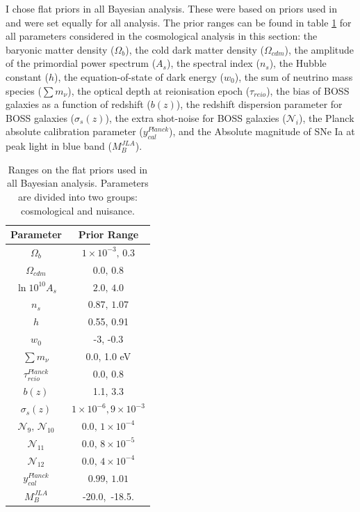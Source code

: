 \qquad I chose flat priors in all Bayesian analysis. These were based on priors used in \cite{JLAdata,2016BOSSCosmology,PlanckCosmology2016,2017arXiv170801530D} and were set equally for all analysis. The prior ranges can be found in table \ref{Tb:Priors} for all parameters considered in the cosmological analysis in this section: the baryonic matter density ($\Omega_b$), the cold dark matter density ($\Omega_{cdm}$), the amplitude of the primordial power spectrum ($A_s$), the spectral index ($n_s$), the Hubble constant ($h$), the equation-of-state of dark energy ($w_0$), the sum of neutrino mass species ($\sum m_{\nu}$), the optical depth at reionisation epoch ($\tau_{reio}$), the bias of BOSS galaxies as a function of redshift ($b(z)$), the redshift dispersion parameter for BOSS galaxies ($\sigma_s(z)$), the extra shot-noise for BOSS galaxies ($\mathcal{N}_i$), the Planck absolute calibration parameter ($y_{cal}^{Planck}$), and the Absolute magnitude of SNe Ia at peak light in blue band ($M_B^{JLA}$).

\begin{table}
  \centering
  \caption[Prior ranges used in the BOSS analysis.]{Ranges on the flat priors used in all Bayesian analysis. Parameters are divided into two groups: cosmological and nuisance.}
  \label{Tb:Priors}
  \begin{tabular}{cc}
    \hline
    \hline
    Parameter & Prior Range \\
    \hline
        \hline
     $\Omega_b$ & $1 \times 10^{-3}, \, 0.3$    \\
     $\Omega_{cdm}$ & $0.0, \, 0.8$    \\[0.1cm]
     $\ln 10^{10} A_s$ & $2.0, \, 4.0$    \\
     $n_s$ & $0.87, \, 1.07$    \\
     $h$ & 0.55, 0.91 \\
     $w_0$ & -3, -0.3\\
     $\sum m_{\nu}$ & 0.0, 1.0 eV\\[0.1cm]
     $\tau^{Planck}_{reio}$  & 0.0, 0.8 \\
     \hline
     $b(z)$  & 1.1, 3.3 \\
     $\sigma_s(z)$ & $1 \times 10^{-6}, 9 \times 10^{-3}$ \\
     $\mathcal{N}_{9}, \, \mathcal{N}_{10}$ & $0.0, \, 1\times 10^{-4}$ \\
     $\mathcal{N}_{11}$ & $0.0, \, 8\times 10^{-5}$ \\
     $\mathcal{N}_{12}$ & $0.0, \, 4\times 10^{-4}$ \\
     $y_{cal}^{Planck}$ & $0.99, \, 1.01$ \\
     $M_B^{JLA}$ & -20.0,\, -18.5.\\
     \hline
        \hline
  \end{tabular}
\end{table}

